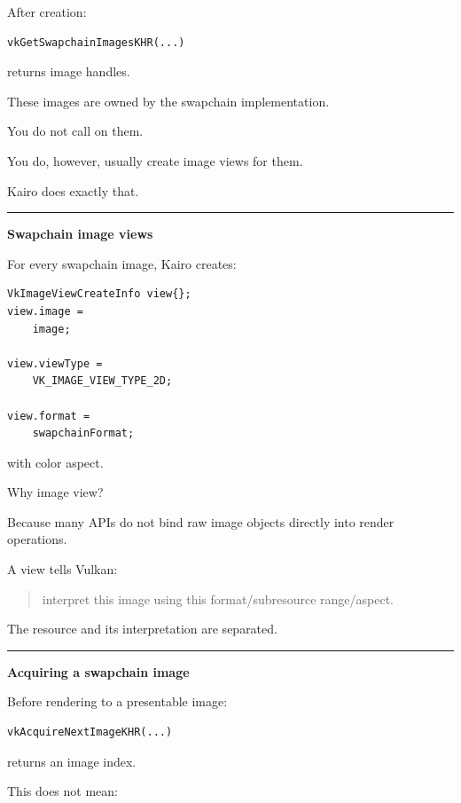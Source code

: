 After creation:

\begin{verbatim}
vkGetSwapchainImagesKHR(...)
\end{verbatim}

returns image handles.

These images are owned by the swapchain implementation.

You do not call  on them.

You do, however, usually create image views for them.

Kairo does exactly that.

\begin{center}\rule{0.5\linewidth}{0.5pt}\end{center}

\textbf{Swapchain image views}

For every swapchain image, Kairo creates:

\begin{verbatim}
VkImageViewCreateInfo view{};
view.image =
    image;

view.viewType =
    VK_IMAGE_VIEW_TYPE_2D;

view.format =
    swapchainFormat;
\end{verbatim}

with color aspect.

Why image view?

Because many APIs do not bind raw image objects directly into render operations.

A view tells Vulkan:

\begin{quote}
interpret this image using this format/subresource range/aspect.
\end{quote}

The resource and its interpretation are separated.

\begin{center}\rule{0.5\linewidth}{0.5pt}\end{center}

\textbf{Acquiring a swapchain image}

Before rendering to a presentable image:

\begin{verbatim}
vkAcquireNextImageKHR(...)
\end{verbatim}

returns an image index.

This does not mean:

